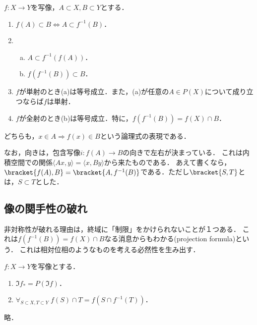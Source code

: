 \documentclass[uplatex,dvipdfmx]{jsreport}
\begin{document}
\begin{proposition}[adjunction]\label{prop-adjunction}
    $f:X\to Y$を写像，$A\subset X,B\subset Y$とする．
    \begin{enumerate}
        \item $f(A)\subset B\Leftrightarrow A\subset f^{-1}(B)$．
        \item \begin{enumerate}[(a)]
            \item $A\subset f^{-1}(f(A))$．
            \item $f(f^{-1}(B))\subset B$．
        \end{enumerate}
        \item $f$が単射のとき(a)は等号成立．また，(a)が任意の$A\in P(X)$について成り立つならば$f$は単射．
        \item $f$が全射のとき(b)は等号成立．特に，$f(f^{-1}(B))=f(X)\cap B$．
    \end{enumerate}
\end{proposition}
\begin{Proof}
    どちらも，$x\in A\Rightarrow f(x)\in B$という論理式の表現である．
\end{Proof}

\begin{remarks}[随伴の向きについて]
    なお，向きは，包含写像$i:f(A)\to B$の向きで左右が決まっている．
    これは内積空間での関係$\langle Ax,y\rangle=\langle x,By\rangle$から来たものである．
    あえて書くなら，$\bracket{f(A),B}=\bracket{A,f^{-1}(B)}$である．ただし$\bracket{S,T}$とは，$S\subset T$とした．
\end{remarks}

\subsection{像の関手性の破れ}

\begin{tcolorbox}[colframe=ForestGreen, colback=ForestGreen!10!white,breakable,colbacktitle=ForestGreen!40!white,coltitle=black,fonttitle=\bfseries\sffamily,
title=]
    非対称性が破れる理由は，終域に「制限」をかけられないことが１つある．
    これは$f(f^{-1}(B))=f(X)\cap B$なる消息からもわかる(projection formula)という．
    これは相対位相のようなものを考える必然性を生み出す．
\end{tcolorbox}

\begin{problem}[像の値域]
    $f:X\to Y$を写像とする．
    \begin{enumerate}
        \item $\Im f_*=P(\Im f)$．
        \item $\forall_{S\subset X,T\subset Y}\;f(S)\cap T=f(S\cap f^{-1}(T))$．
    \end{enumerate}
\end{problem}
\begin{Proof}
    略．
\end{Proof}
\end{document}
